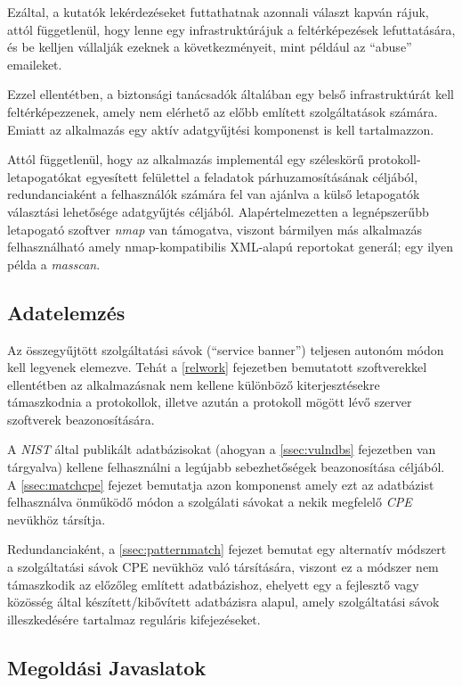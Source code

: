\documentclass[a4paper,12pt]{article}
\begin{document}
	Ezáltal, a kutatók lekérdezéseket futtathatnak azonnali választ kapván rájuk, attól függetlenül, hogy lenne egy infrastruktúrájuk a feltérképezések lefuttatására, és be kelljen vállalják ezeknek a következményeit, mint például az ``abuse'' emaileket.
	
	Ezzel ellentétben, a biztonsági tanácsadók általában egy belső infrastruktúrát kell feltérképezzenek, amely nem elérhető az előbb említett szolgáltatások számára. Emiatt az alkalmazás egy aktív adatgyűjtési komponenst is kell tartalmazzon.
	
	Attól függetlenül, hogy az alkalmazás implementál egy széleskörű protokoll-letapogatókat egyesített felülettel a feladatok párhuzamosításának céljából, redundanciaként a felhasználók számára fel van ajánlva a külső letapogatók választási lehetősége adatgyűjtés céljából. Alapértelmezetten a legnépszerűbb letapogató szoftver \textit{nmap} van támogatva, viszont bármilyen más alkalmazás felhasználható amely nmap-kompatibilis XML-alapú reportokat generál; egy ilyen példa a \textit{masscan}.

\subsection{Adatelemzés}

	Az összegyűjtött szolgáltatási sávok (``service banner'') teljesen autonóm módon kell legyenek elemezve. Tehát a \ref{relwork} fejezetben bemutatott szoftverekkel ellentétben az alkalmazásnak nem kellene különböző kiterjesztésekre támaszkodnia a protokollok, illetve azután a protokoll mögött lévő szerver szoftverek beazonosítására.

	A \textit{NIST} által publikált adatbázisokat (ahogyan a \ref{ssec:vulndbs} fejezetben van tárgyalva) kellene felhasználni a legújabb sebezhetőségek beazonosítása céljából. A \ref{ssec:matchcpe} fejezet bemutatja azon komponenst amely ezt az adatbázist felhasználva önműködő módon a szolgálati sávokat a nekik megfelelő \textit{CPE} nevükhöz társítja.

	Redundanciaként, a \ref{ssec:patternmatch} fejezet bemutat egy alternatív módszert a szolgáltatási sávok CPE nevükhöz való társítására, viszont ez a módszer nem támaszkodik az előzőleg említett adatbázishoz, ehelyett egy a fejlesztő vagy közösség által készített/kibővített adatbázisra alapul, amely szolgáltatási sávok illeszkedésére tartalmaz reguláris kifejezéseket.

\subsection{Megoldási Javaslatok}
\end{document}
